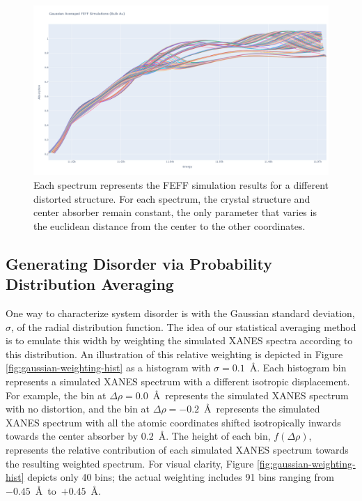 \begin{figure}[h]
	\centering
	\includegraphics[width=\linewidth]{Chapters/Figures/newplot.png}
	\caption[FEFF Simulations Results]{Each spectrum represents the FEFF simulation results for a different distorted structure. For each spectrum, the crystal structure and center absorber remain constant, the only parameter that varies is the euclidean distance from the center to the other coordinates.}
	\label{fig:feff-results}
\end{figure}

\subsection{Generating Disorder via Probability Distribution Averaging}

One way to characterize system disorder is with the Gaussian standard deviation, $ \sigma $, of the radial distribution function. The idea of our statistical averaging method is to emulate this width by weighting the simulated XANES spectra according to this distribution. An illustration of this relative weighting is depicted in Figure \ref{fig:gaussian-weighting-hist} as a histogram with $ \sigma=0.1 $~\AA. Each histogram bin represents a simulated XANES spectrum with a different isotropic displacement. For example, the bin at $ \Delta\rho=0.0 $~\AA~represents the simulated XANES spectrum with no distortion, and the bin at $ \Delta\rho=-0.2 $~\AA~represents the simulated XANES spectrum with all the atomic coordinates shifted isotropically inwards towards the center absorber by $ 0.2 $~\AA. The height of each bin, $ f(\Delta\rho) $, represents the relative contribution of each simulated XANES spectrum towards the resulting weighted spectrum. For visual clarity, Figure \ref{fig:gaussian-weighting-hist} depicts only 40 bins; the actual weighting includes 91 bins ranging from $ -0.45 $~\AA~to~$ +0.45 $~\AA.

